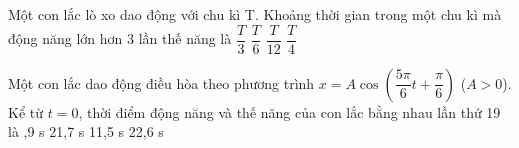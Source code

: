 \begin{vidu}%
Một con lắc lò xo dao động với chu kì T. Khoảng thời gian trong một chu kì mà động năng lớn hơn 3 lần thế năng là
\choice
{\True $\dfrac{T}{3}$}
{$\dfrac{T}{6}$}
{$\dfrac{T}{12}$}
{$\dfrac{T}{4}$}
\end{vidu} %
\begin{vidu}%
Một con lắc dao động điều hòa theo phương trình $ x=A\cos  \left( \dfrac{5\pi}{6}t+\dfrac{\pi}{6} \right) $ ($A > 0$). Kể từ $t = 0$, thời điểm động năng và thế năng của con lắc bằng nhau lần thứ 19 là
\choice
{,9 s}
{21,7 s}
{11,5 s}
{22,6 s}
\end{vidu} %





